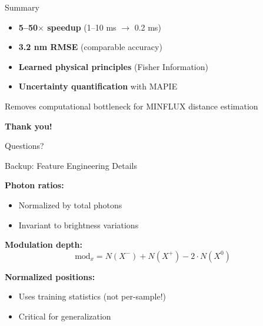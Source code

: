\documentclass[aspectratio=169]{beamer}
\begin{document}
\begin{frame}{Summary}
    
    \begin{itemize}
        \item[\checkmark] \textbf{5--50$\times$ speedup} (1--10 ms $\rightarrow$ 0.2 ms)
        \item[\checkmark] \textbf{3.2 nm RMSE} (comparable accuracy)
        \item[\checkmark] \textbf{Learned physical principles} (Fisher Information)
        \item[\checkmark] \textbf{Uncertainty quantification} with MAPIE
    \end{itemize}
    
    \vspace{0.8cm}
    
    \centering
    {\Large Removes computational bottleneck for MINFLUX distance estimation}
    
    \vspace{1cm}
    
    {\Large\textbf{Thank you!}}
    
    \vspace{0.3cm}
    
    {\large Questions?}
    
\end{frame}

\appendix

\begin{frame}{Backup: Feature Engineering Details}
    
    \textbf{Photon ratios:}
    \begin{itemize}
        \item Normalized by total photons
        \item Invariant to brightness variations
    \end{itemize}
    
    \vspace{0.3cm}
    
    \textbf{Modulation depth:}
    \begin{equation*}
        \text{mod}_x = N(X^-) + N(X^+) - 2 \cdot N(X^0)
    \end{equation*}
    
    \vspace{0.3cm}
    
    \textbf{Normalized positions:}
    \begin{itemize}
        \item Uses training statistics (not per-sample!)
        \item Critical for generalization
    \end{itemize}
    
\end{frame}
\end{document}
